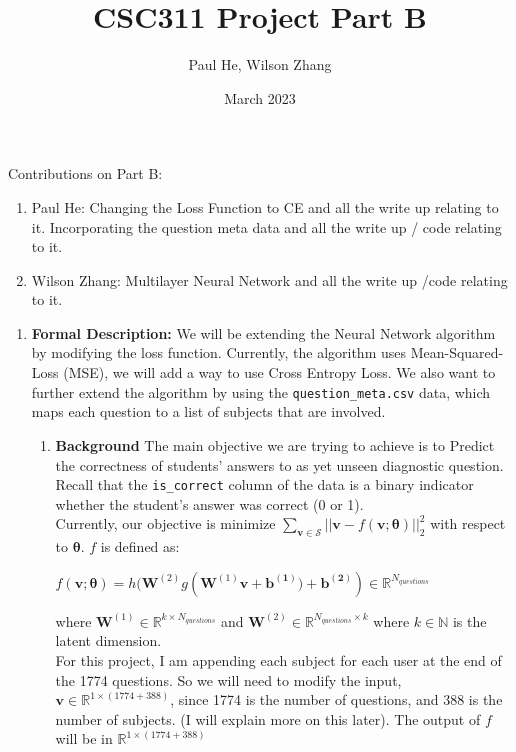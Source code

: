 \documentclass{article}
\title{CSC311 Project Part B}
\author{Paul He, Wilson Zhang}
\date{March 2023}
\begin{document}
\maketitle
Contributions on Part B: \begin{enumerate}
    \item Paul He: Changing the Loss Function to CE and all the write up relating to it. Incorporating the question meta data and all the write up / code relating to it. 
    \item Wilson Zhang: Multilayer Neural Network and all the write up /code relating to it.
\end{enumerate}

\begin{enumerate}
\item \textbf{Formal Description:}
We will be extending the Neural Network algorithm by modifying the loss function. Currently, the algorithm uses Mean-Squared-Loss (MSE), we will add a way to use Cross Entropy Loss. We also want to further extend the algorithm by using the \texttt{question\_meta.csv} data, which maps each question to a list of subjects that are involved. 

\begin{enumerate}
    \item \textbf{Background}
    The main objective we are trying to achieve is to Predict the correctness of students' answers to as yet unseen diagnostic question. Recall that the \texttt{is\_correct} column of the data is a binary indicator whether the student's answer was correct (0 or 1). \\

     Currently, our objective is minimize $\sum_{\mathbf{v} \in \mathcal{S}} ||\mathbf{v} - f(\mathbf{v;}\bm{\theta})||^2_2$ with respect to $\bm{\theta}$. $f$ is defined as:
     
     \begin{tcolorbox}[colback=gray!5!white,colframe=gray!75!black]
     $f(\mathbf{v;}\bm{\theta}) = h(\mathbf{W}^{(2)}g(\mathbf{W}^{(1)}\mathbf{v + b^{(1)}) + b^{(2)}}) \in \mathbb{R}^{N_{questions}}$
     \end{tcolorbox}
     where $\mathbf{W}^{(1)} \in \mathbb{R}^{k \times N_{questions}}$ and $\mathbf{W}^{(2)} \in \mathbb{R}^{N_{questions} \times k}$ where $k \in \mathbb{N}$ is the latent dimension. \\

     For this project, I am appending each subject for each user at the end of the 1774 questions. So we will need to modify the input,  $\mathbf{v} \in \mathbb{R}^{1 \times (1774+388)}$, since 1774 is the number of questions, and 388 is the number of subjects. (I will explain more on this later). The output of $f$ will be in $\mathbb{R}^{1 \times (1774+388)}$ \\
     

\end{enumerate}
\end{enumerate}
\end{document}
